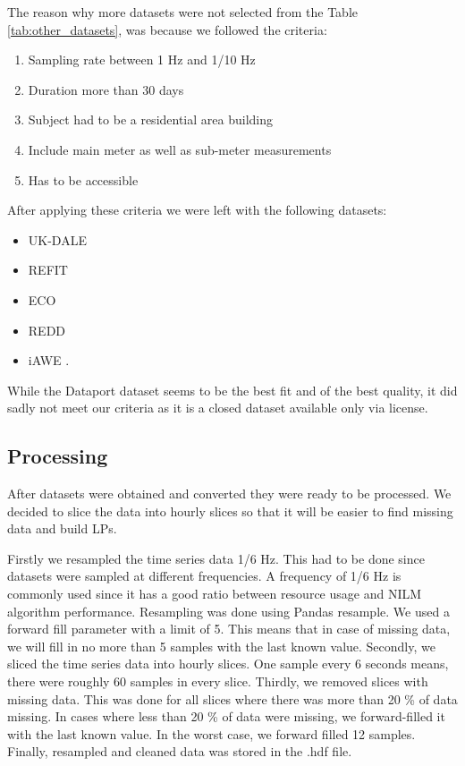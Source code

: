 


The reason why more datasets were not selected from the Table \ref{tab:other_datasets},
was because we followed the criteria:
\begin{enumerate}
    \item Sampling rate between 1 Hz and 1/10 Hz
    \item Duration more than 30 days
    \item Subject had to be a residential area building
    \item Include main meter as well as sub-meter measurements
    \item Has to be accessible
\end{enumerate}

After applying these criteria we were left with the following datasets:

\begin{itemize}
    \item UK-DALE \cite{UKDALE}
    \item REFIT \cite{REFIT}
    \item ECO \cite{ECO}
    \item REDD \cite{REDD}
    \item iAWE \cite{iAWE}.
\end{itemize}

While the Dataport dataset seems to be the best fit and of the best quality, it did sadly not meet our criteria as it is a closed dataset available only via license.

\subsection{Processing}

After datasets were obtained and converted they were ready to be processed.
We decided to slice the data into hourly slices so that it will be easier to find missing data and build LPs.

Firstly we resampled the time series data  1/6 Hz. 
This had to be done since datasets were sampled at different frequencies.
A frequency of 1/6 Hz is commonly used since it has a good ratio between resource usage and NILM algorithm performance.
Resampling was done using Pandas resample. 
We used a forward fill parameter with a limit of 5.
This means that in case of missing data, we will fill in no more than 5 samples with the last known value.
Secondly, we sliced the time series data into hourly slices. 
One sample every 6 seconds means, there were roughly 60 samples in every slice.
Thirdly, we removed slices with missing data.
This was done for all slices where there was more than 20 \% of data missing.
In cases where less than 20 \% of data were missing, we forward-filled it with the last known value.
In the worst case, we forward filled 12 samples. 
Finally, resampled and cleaned data was stored in the .hdf file.


